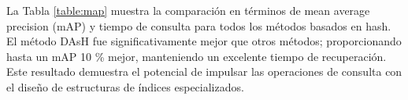 La Tabla  \ref{table:map} muestra la comparación en términos de mean average precision (mAP)  y tiempo de consulta para todos los métodos basados en hash. El método DAsH fue significativamente mejor que otros métodos; proporcionando hasta un mAP 10 \% mejor,  manteniendo un excelente tiempo de recuperación. Este resultado demuestra el potencial de impulsar las operaciones de consulta con el diseño de estructuras de índices especializados.
 
